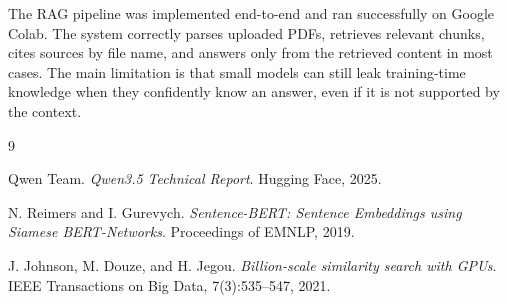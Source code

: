 \documentclass[11pt,a4paper]{article}
\begin{document}
The RAG pipeline was implemented end-to-end and ran successfully on Google Colab. The system correctly parses uploaded PDFs, retrieves relevant chunks, cites sources by file name, and answers only from the retrieved content in most cases. The main limitation is that small models can still leak training-time knowledge when they confidently know an answer, even if it is not supported by the context.

\begin{thebibliography}{9}

Qwen Team.
\textit{Qwen3.5 Technical Report}.
Hugging Face, 2025.

N. Reimers and I. Gurevych.
\textit{Sentence-BERT: Sentence Embeddings using Siamese BERT-Networks}.
Proceedings of EMNLP, 2019.

J. Johnson, M. Douze, and H. Jegou.
\textit{Billion-scale similarity search with GPUs}.
IEEE Transactions on Big Data, 7(3):535--547, 2021.

\end{thebibliography}
\end{document}
